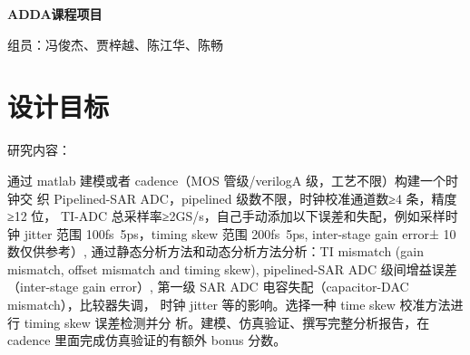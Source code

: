 \documentclass[cs4size,a4paper]{ctexart}
\numberwithin{equation}{section}
\numberwithin{table}{section}
\numberwithin{figure}{section}
\begin{document}
\newtheorem{example}{例}              %
\newtheorem{algorithm}{算法}
\newtheorem{theorem}{定理}            %
\newtheorem{definition}{定义}
\newtheorem{axiom}{公理}
\newtheorem{property}{性质}
\newtheorem{proposition}{命题}
\newtheorem{lemma}{引理}
\newtheorem{corollary}{推论}
\newtheorem{remark}{注解}
\newtheorem{condition}{条件}
\newtheorem{conclusion}{结论}
\newtheorem{assumption}{假设}
\renewcommand{\contentsname}{目录}     
\renewcommand{\abstractname}{摘要} 
\renewcommand{\refname}{参考文献}     
\renewcommand{\indexname}{索引}
\renewcommand{\figurename}{图}
\renewcommand{\tablename}{表}
\renewcommand{\appendixname}{附录}
\renewcommand{\proofname}{证明}
\renewcommand{\algorithm}{算法} 
% 
\pagestyle{plain}
% 
\pagestyle{empty}
\pagestyle{plain}
% 
% 
% 
% 
% 

\begin{center}
    \textsc{ \bfseries ADDA课程项目}\\[0.3cm]
\end{center}

\begin{center}
	组员：冯俊杰、贾梓越、陈江华、陈畅
\end{center}

\section{设计目标}
\noindent
研究内容：

通过 matlab 建模或者 cadence（MOS 管级/verilogA 级，工艺不限）构建一个时钟交
织 Pipelined-SAR ADC，pipelined 级数不限，时钟校准通道数≥4 条，精度≥12 位，
TI-ADC 总采样率≥2GS/s，自己手动添加以下误差和失配，例如采样时钟 jitter 范围
100fs~5ps，timing skew 范围 200fs~5ps, inter-stage gain error± 10%
数仅供参考）, 通过静态分析方法和动态分析方法分析：TI mismatch (gain mismatch,
offset mismatch and timing skew), pipelined-SAR ADC 级间增益误差（inter-stage 
gain error）, 第一级 SAR ADC 电容失配（capacitor-DAC mismatch），比较器失调，
时钟 jitter 等的影响。选择一种 time skew 校准方法进行 timing skew 误差检测并分
析。建模、仿真验证、撰写完整分析报告，在 cadence 里面完成仿真验证的有额外 bonus
分数。
\end{document}
